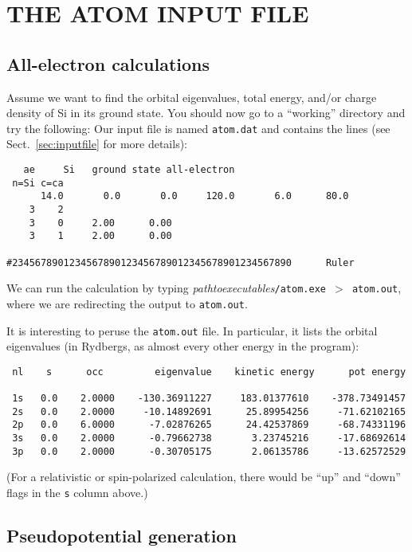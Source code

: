 \documentclass[11pt]{article}
\begin{document}
\section{THE ATOM INPUT FILE}


\subsection{All-electron calculations}

Assume we want to find the orbital eigenvalues, total energy, and/or
charge density of Si in its ground state. You should now go to a ``working''
directory and try the following:  Our
input file is named {\tt atom.dat} and contains the lines (see
Sect.~\ref{sec:inputfile} for more details):

\begin{verbatim}
   ae     Si   ground state all-electron
 n=Si c=ca
      14.0       0.0       0.0     120.0       6.0      80.0
    3    2
    3    0     2.00      0.00
    3    1     2.00      0.00

#2345678901234567890123456789012345678901234567890      Ruler
\end{verbatim}

We can run the calculation by typing
\textit{pathtoexecutables}\texttt{/atom.exe $>$ atom.out},
where we are redirecting the output to \texttt{atom.out}.


It is interesting to peruse the \texttt{atom.out} file.
In particular, it lists the orbital eigenvalues (in Rydbergs, as almost
every other energy in the program):

\begin{verbatim}
 nl    s      occ         eigenvalue    kinetic energy      pot energy

 1s   0.0    2.0000    -130.36911227     183.01377610    -378.73491457
 2s   0.0    2.0000     -10.14892691      25.89954256     -71.62102165
 2p   0.0    6.0000      -7.02876265      24.42537869     -68.74331196
 3s   0.0    2.0000      -0.79662738       3.23745216     -17.68692614
 3p   0.0    2.0000      -0.30705175       2.06135786     -13.62572529
\end{verbatim}

(For a relativistic or spin-polarized calculation, there would be
``up'' and ``down'' flags in the {\tt s} column above.)

\subsection{Pseudopotential generation}
\end{document}
